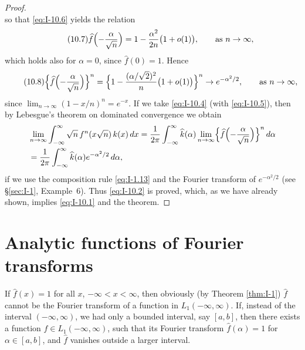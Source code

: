 \begin{proof}
\begin{equation*}
\end{equation*}
so that \eqref{eq:I-10.6} yields the relation
\begin{equation}\label{eq:I-10.7}\tag{10.7}
\widehat f\Bigl(-\frac{\alpha}{\sqrt n}\Bigr)
=1-\frac{\alpha^{2}}{2n}\bigl(1+o(1)\bigr),\qquad\text{as }n\to\infty,
\end{equation}
which holds also for $\alpha=0$, since $\widehat f(0)=1$. Hence
\begin{equation}\label{eq:I-10.8}\tag{10.8}
\Bigl\{\widehat f\Bigl(-\frac{\alpha}{\sqrt n}\Bigr)\Bigr\}^n
=\Bigl\{1-\frac{(\alpha/\sqrt2)^{2}}{n}\bigl(1+o(1)\bigr)\Bigr\}^n
\to e^{-\alpha^{2}/2},\qquad\text{as }n\to\infty,
\end{equation}
since $\lim_{n\to\infty}(1-x/n)^n=e^{-x}$. If we take \eqref{eq:I-10.4} (with \eqref{eq:I-10.5}), then by Lebesgue's theorem on dominated convergence we obtain
\begin{equation*}
\begin{aligned}
&\lim_{n\to\infty}\int_{-\infty}^{\infty}\sqrt n\,f^n(x\sqrt n)\,k(x)\,dx = \frac{1}{2\pi}\int_{-\infty}^{\infty}\widehat k(\alpha)\lim_{n\to\infty}\Bigl\{\widehat f\Bigl(-\frac{\alpha}{\sqrt n}\Bigr)\Bigr\}^n\,d\alpha\\
&= \frac{1}{2\pi}\int_{-\infty}^{\infty}\widehat k(\alpha)e^{-\alpha^{2}/2}\,d\alpha,
\end{aligned}
\end{equation*}
if we use the composition rule \eqref{eq:I-1.13} and the Fourier transform of $e^{-\alpha^{2}/2}$ (see \S\ref{sec:I-1}, Example~6). Thus \eqref{eq:I-10.2} is proved, which, as we have already shown, implies \eqref{eq:I-10.1} and the theorem.
\end{proof}

\section{Analytic functions of Fourier transforms}
\label{sec:I-11}

If $\widehat f(x)=1$ for all $x$, $-\infty<x<\infty$, then obviously (by Theorem \ref{thm:I-1}) $\widehat f$ cannot be the Fourier transform of a function in $L_1(-\infty,\infty)$. If, instead of the interval $(-\infty,\infty)$, we had only a bounded interval, say $[a,b]$, then there exists a function $f\in L_1(-\infty,\infty)$, such that its Fourier transform $\widehat f(\alpha)=1$ for $\alpha\in[a,b]$, and $\widehat f$ vanishes outside a larger interval.

